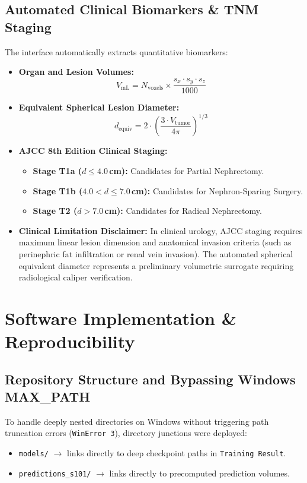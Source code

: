 \documentclass[11pt,a4paper]{report}
\begin{document}
\section{Automated Clinical Biomarkers \& TNM Staging}
The interface automatically extracts quantitative biomarkers:
\begin{itemize}
    \item \textbf{Organ and Lesion Volumes:}
    \begin{equation}
    V_{\mathrm{mL}} = N_{\mathrm{voxels}} \times \frac{s_x \cdot s_y \cdot s_z}{1000}
    \end{equation}
    \item \textbf{Equivalent Spherical Lesion Diameter:}
    \begin{equation}
    d_{\mathrm{equiv}} = 2 \cdot \left(\frac{3 \cdot V_{\mathrm{tumor}}}{4 \pi}\right)^{1/3}
    \end{equation}
    \item \textbf{AJCC 8th Edition Clinical Staging:}
    \begin{itemize}
        \item \textbf{Stage T1a ($d \le 4.0$\,cm):} Candidates for Partial Nephrectomy.
        \item \textbf{Stage T1b ($4.0 < d \le 7.0$\,cm):} Candidates for Nephron-Sparing Surgery.
        \item \textbf{Stage T2 ($d > 7.0$\,cm):} Candidates for Radical Nephrectomy.
    \end{itemize}
    \item \textbf{Clinical Limitation Disclaimer:} In clinical urology, AJCC staging requires maximum linear lesion dimension and anatomical invasion criteria (such as perinephric fat infiltration or renal vein invasion). The automated spherical equivalent diameter represents a preliminary volumetric surrogate requiring radiological caliper verification.
\end{itemize}

\chapter{Software Implementation \& Reproducibility}

\section{Repository Structure and Bypassing Windows MAX\_PATH}
To handle deeply nested directories on Windows without triggering path truncation errors (\texttt{WinError 3}), directory junctions were deployed:
\begin{itemize}
    \item \texttt{models/} $\rightarrow$ links directly to deep checkpoint paths in \texttt{Training Result}.
    \item \texttt{predictions\_s101/} $\rightarrow$ links directly to precomputed prediction volumes.
\end{itemize}
\end{document}
